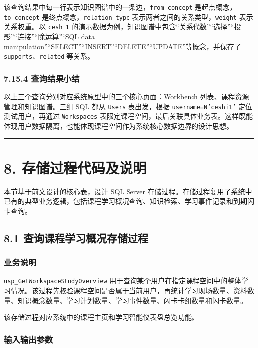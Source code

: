 \documentclass[10pt,a4paper,fontset=none]{ctexart}
\begin{document}
该查询结果中每一行表示知识图谱中的一条边，\texttt{from\_concept} 是起点概念，\texttt{to\_concept} 是终点概念，\texttt{relation\_type} 表示两者之间的关系类型，\texttt{weight} 表示关系权重。以 \texttt{ceshi1} 的演示数据为例，知识图谱中包含“关系代数”“选择”“投影”“连接”“除运算”“SQL data manipulation”“SELECT”“INSERT”“DELETE”“UPDATE”等概念，并保存了 \texttt{supports}、\texttt{related} 等关系。\par

\subsubsection*{7.15.4 查询结果小结}

以上三个查询分别对应系统原型中的三个核心页面：Workbench 列表、课程资源管理和知识图谱。三组 SQL 都从 \texttt{Users} 表出发，根据 \texttt{username=N'ceshi1'} 定位测试用户，再通过 \texttt{Workspaces} 表限定课程空间，最后关联具体业务表。这样既能体现用户数据隔离，也能体现课程空间作为系统核心数据边界的设计思想。\par

\bigskip\hrule\bigskip
\clearpage
\section*{8. 存储过程代码及说明}

本节基于前文设计的核心表，设计 SQL Server 存储过程。存储过程复用了系统中已有的典型业务逻辑，包括课程学习概况查询、知识检索、学习事件记录和到期闪卡查询。\par

\subsection*{8.1 查询课程学习概况存储过程}

\subsubsection*{业务说明}

\texttt{usp\_GetWorkspaceStudyOverview} 用于查询某个用户在指定课程空间中的整体学习情况。该过程先校验课程空间是否属于当前用户，再统计学习现场数量、资料数量、知识概念数量、学习计划数量、学习事件数量、闪卡卡组数量和闪卡数量。\par

该存储过程对应系统中的课程主页和学习智能仪表盘总览功能。\par

\subsubsection*{输入输出参数}
\end{document}
